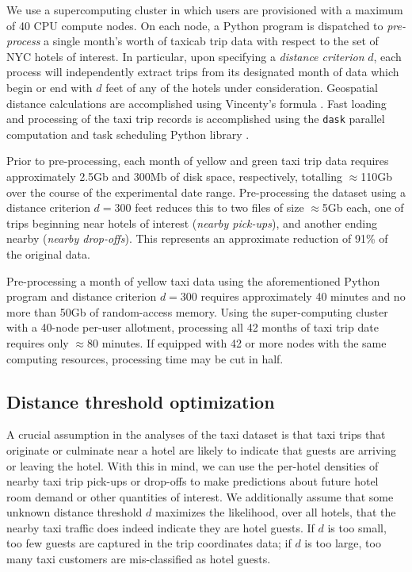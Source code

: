 \documentclass[useAMS, usenatbib]{biom}
\begin{document}
We use a supercomputing cluster in which users are provisioned with a maximum of 40 CPU compute nodes. On each node, a Python program is dispatched to \textit{pre-process} a single month's worth of taxicab trip data with respect to the set of NYC hotels of interest. In particular, upon specifying a \textit{distance criterion} $d$, each process will independently extract trips from its designated month of data which begin or end with $d$ feet of any of the hotels under consideration. Geospatial distance calculations are accomplished using Vincenty's formula \citep{bessel_calculation_2010}. Fast loading and processing of the taxi trip records is accomplished using the \texttt{dask} parallel computation and task scheduling Python library \citep{dask}.

Prior to pre-processing, each month of yellow and green taxi trip data requires approximately 2.5Gb and 300Mb of disk space, respectively, totalling $\approx$110Gb over the course of the experimental date range. Pre-processing the dataset using a distance criterion $d = 300$ feet reduces this to two files of size $\approx$5Gb each, one of trips beginning near hotels of interest (\textit{nearby pick-ups}), and another ending nearby (\textit{nearby drop-offs}). This represents an approximate reduction of 91\% of the original data.

Pre-processing a month of yellow taxi data using the aforementioned Python program and distance criterion $d = 300$ requires approximately 40 minutes and no more than 50Gb of random-access memory. Using the super-computing cluster with a 40-node per-user allotment, processing all 42 months of taxi trip date requires only $\approx$80 minutes. If equipped with 42 or more nodes with the same computing resources, processing time may be cut in half.

\subsection{Distance threshold optimization}
\label{ss:distance_opt}

A crucial assumption in the analyses of the taxi dataset is that taxi trips that originate or culminate near a hotel are likely to indicate that guests are arriving or leaving the hotel. With this in mind, we can use the per-hotel densities of nearby taxi trip pick-ups or drop-offs to make predictions about future hotel room demand or other quantities of interest. We additionally assume that some unknown distance threshold $d$ maximizes the likelihood, over all hotels, that the nearby taxi traffic does indeed indicate they are hotel guests. If $d$ is too small, too few guests are captured in the trip coordinates data; if $d$ is too large, too many taxi customers are mis-classified as hotel guests.
\end{document}
